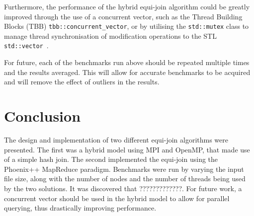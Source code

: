 \documentclass[11pt,twocolumn]{witseiepaper}
\begin{document}
Furthermore, the performance of the hybrid equi-join algorithm could be greatly improved through the use of a concurrent vector, such as the Thread Building Blocks (TBB) \texttt{tbb::concurrent\_vector}, or by utilising the \texttt{std::mutex} class to manage thread synchronisation of modification operations to the STL \texttt{std::vector}~\cite{tbb,mutex}.

For future, each of the benchmarks run above should be repeated multiple times and the results averaged. This will allow for  accurate benchmarks to be acquired and will remove the effect of outliers in the results.

\section{Conclusion}
The design and implementation of two different equi-join algorithms were presented. The first was a hybrid model using MPI and OpenMP, that made use of a simple hash join. The second implemented the equi-join using the Phoenix++ MapReduce paradigm. Benchmarks were run by varying the input file size, along with the number of nodes and the number of threads being used by the two solutions. It was discovered that ?????????????. For future work, a concurrent vector should be used in the hybrid model to allow for parallel querying, thus drastically improving performance.



\end{document}

